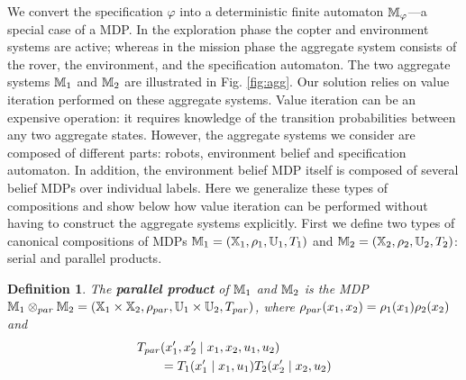 \documentclass[conference]{IEEEtran}
\newtheorem{definition}{Definition}
\begin{document}
We convert the specification $\varphi$ into a deterministic finite automaton $\mathbb{M}_\varphi$---a special case of a MDP. In the exploration phase the copter and environment systems are active; whereas in the mission phase the aggregate system consists of the rover, the environment, and the specification automaton. The two aggregate systems $\mathbb{M}_1$ and $\mathbb{M}_2$ are illustrated in Fig. \ref{fig:agg}. Our solution relies on value iteration performed on these aggregate systems. Value iteration can be an expensive operation: it requires knowledge of the transition probabilities between any two aggregate states. However, the aggregate systems we consider are composed of different parts: robots, environment belief and specification automaton. In addition, the environment belief MDP itself is composed of several belief MDPs over individual labels. Here we generalize these types of compositions and show below how value iteration can be performed without having to construct the aggregate systems explicitly. First we define two types of canonical compositions of MDPs $\mathbb{M}_1 = (\mathbb{X}_1, \rho_1, \mathbb{U}_1, T_1)$ and $\mathbb{M}_2 = (\mathbb{X}_2, \rho_2, \mathbb{U}_2, T_2)$: serial and parallel products.
\begin{definition}
  The \textbf{parallel product} of $\mathbb{M}_1$ and $\mathbb{M}_2$ is the MDP $\mathbb{M}_1 \otimes_{par} \mathbb{M}_2 = (\mathbb{X}_1 \times \mathbb{X}_2, \rho_{par}, \mathbb{U}_1 \times \mathbb{U}_2, T_{par})$, where $\rho_{par}(x_1, x_2) = \rho_1(x_1) \rho_2(x_2)$
  and
  \begin{equation}
  \begin{aligned}
      T_{par}&(x_1', x_2' \mid x_1, x_2, u_1, u_2) \\
      & = T_1 (x_1' \mid x_1, u_1) T_2 (x_2' \mid x_2, u_2)
  \end{aligned}
  \end{equation}
\end{definition}
\end{document}
